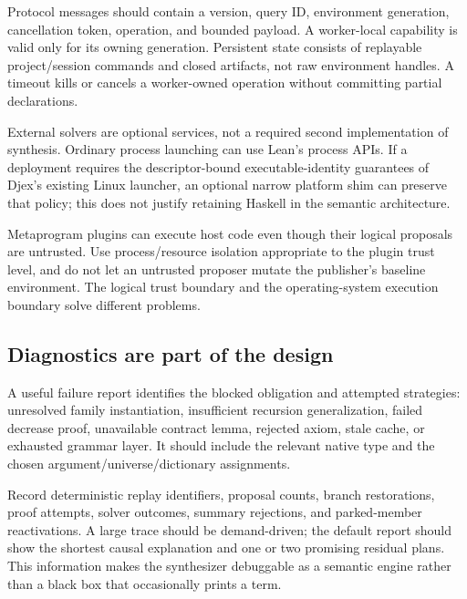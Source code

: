 Protocol messages should contain a version, query ID, environment generation, cancellation token, operation, and bounded payload. A worker-local capability is valid only for its owning generation. Persistent state consists of replayable project/session commands and closed artifacts, not raw environment handles. A timeout kills or cancels a worker-owned operation without committing partial declarations.

External solvers are optional services, not a required second implementation of synthesis. Ordinary process launching can use Lean's process APIs. If a deployment requires the descriptor-bound executable-identity guarantees of Djex's existing Linux launcher, an optional narrow platform shim can preserve that policy; this does not justify retaining Haskell in the semantic architecture.\cite{djexarchitecture}

Metaprogram plugins can execute host code even though their logical proposals are untrusted. Use process/resource isolation appropriate to the plugin trust level, and do not let an untrusted proposer mutate the publisher's baseline environment. The logical trust boundary and the operating-system execution boundary solve different problems.

\subsection{Diagnostics are part of the design}
A useful failure report identifies the blocked obligation and attempted strategies: unresolved family instantiation, insufficient recursion generalization, failed decrease proof, unavailable contract lemma, rejected axiom, stale cache, or exhausted grammar layer. It should include the relevant native type and the chosen argument/universe/dictionary assignments.

Record deterministic replay identifiers, proposal counts, branch restorations, proof attempts, solver outcomes, summary rejections, and parked-member reactivations. A large trace should be demand-driven; the default report should show the shortest causal explanation and one or two promising residual plans. This information makes the synthesizer debuggable as a semantic engine rather than a black box that occasionally prints a term.

